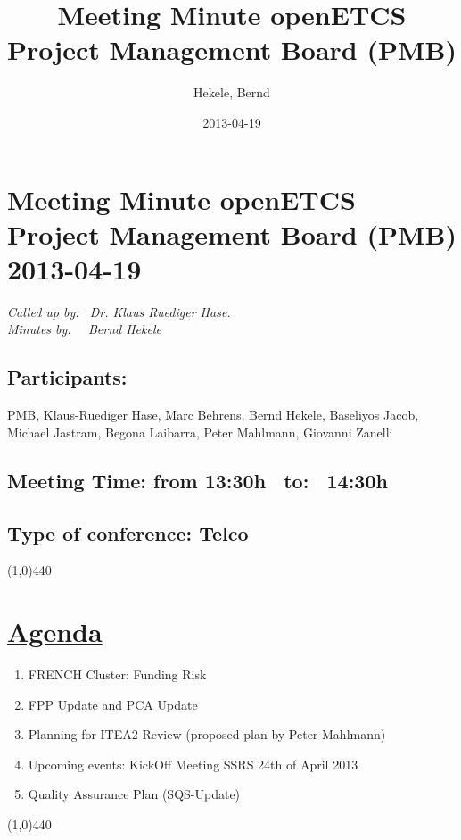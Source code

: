 \documentclass[a4paper]{article}
\title{Meeting Minute openETCS Project Management Board (PMB)}
\author{Hekele, Bernd}
\date{2013-04-19}
\begin{document}
\section*{\large{Meeting Minute openETCS Project Management Board (PMB) 2013-04-19}}

\emph{Called up by: \ Dr. Klaus Ruediger Hase.}\\
\emph{Minutes by: \ \  Bernd Hekele}


\subsection*{Participants:} PMB, 
Klaus-Ruediger Hase, 
Marc Behrens, 
Bernd Hekele,
Baseliyos Jacob,
Michael Jastram, 
Begona Laibarra,
Peter Mahlmann, 
Giovanni Zanelli\\



\subsection*{Meeting Time: from 13:30h \ to: \ 14:30h}

\subsection*{Type of conference: Telco}

\line(1,0){440}
\section*{\underline{Agenda}}
\begin{enumerate}
\item FRENCH Cluster: Funding Risk
\item FPP Update and PCA Update
\item Planning for ITEA2 Review (proposed plan by Peter Mahlmann)
\item Upcoming events: KickOff Meeting SSRS 24th of April 2013
\item Quality Assurance Plan (SQS-Update)
\end{enumerate}
\line(1,0){440}
\end{document}
